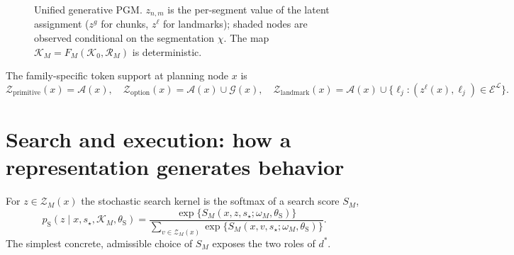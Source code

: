 \documentclass[11pt]{article}
\begin{document}
\begin{figure}[htbp]
\centering
{}
\caption{Unified generative PGM. $z_{n,m}$ is the per-segment value of the latent assignment
($z^{g}$ for chunks, $z^{\ell}$ for landmarks); shaded nodes are observed conditional on the
segmentation $\chi$. The map $\mathcal K_M=F_M(\mathcal K_0,\mathcal R_M)$ is deterministic.}
\label{fig:pgm}
\end{figure}

The family-specific token support at planning node $x$ is
\begin{equation}
\mathcal Z_{\mathrm{primitive}}(x)=\mathcal A(x),\quad
\mathcal Z_{\mathrm{option}}(x)=\mathcal A(x)\cup\mathcal G(x),\quad
\mathcal Z_{\mathrm{landmark}}(x)=\mathcal A(x)\cup\{\ell_j:(z^{\ell}(x),\ell_j)\in\mathcal E^{\mathcal L}\}.
\label{eq:support}
\end{equation}

\section{Search and execution: how a representation generates behavior}
\label{sec:search}

For $z\in\mathcal Z_M(x)$ the stochastic search kernel is the softmax of a search score
$S_M$,
\begin{equation}
p_{\mathrm S}(z\mid x,s_\star,\mathcal K_M,\theta_{\mathrm S})
=\frac{\exp\{S_M(x,z,s_\star;\omega_M,\theta_{\mathrm S})\}}
{\sum_{v\in\mathcal Z_M(x)}\exp\{S_M(x,v,s_\star;\omega_M,\theta_{\mathrm S})\}}.
\label{eq:kernel}
\end{equation}
The simplest concrete, admissible choice of $S_M$ exposes the two roles of $d^{*}$.
\end{document}

